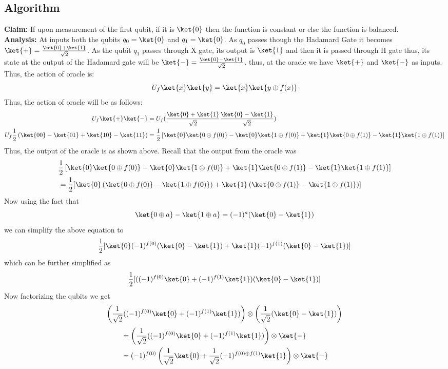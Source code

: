\documentclass[12pt, oneside]{book}
\theoremstyle{definition}
\theoremstyle{definition}
\theoremstyle{remark}
\begin{document}
\subsection{Algorithm}
\textbf{Claim: }If upon measurement of the first qubit, if it is $\ket{0}$ then the function is constant or else the function is balanced.
\\
\textbf{Analysis: }At inputs both the qubits $q_0=\ket{0}$ and $q_1=\ket{0}$. As $q_0$ passes though the Hadamard Gate it becomes $\ket{+}=\frac{\ket{0}+\ket{1}}{\sqrt{2}}$.
As the qubit $q_1$ passes through X gate, its output is $\ket{1}$ and then it is passed through H gate thus, its state at the output of the Hadamard gate will be $\ket{-}= \frac{\ket{0}-\ket{1}}{\sqrt{2}}$.
thus, at the oracle we have $\ket{+}$ and $\ket{-}$ as inputs. Thus, the action of oracle is:
\[
    U_f\ket{x}\ket{y}=\ket{x}\ket{y\oplus f(x)}
\]
Thus, the action of oracle will be as follows:
\begin{align*}
    U_f\ket{+}\ket{-}&=U_f(\frac{\ket{0}+\ket{1}}{\sqrt{2}}\frac{\ket{0}-\ket{1}}{\sqrt{2}})\\
    U_f\frac{1}{2}\left(\ket{00}-\ket{01}+\ket{10}-\ket{11}\right)&=\frac{1}{2}\left[\ket{0}\ket{0\oplus f(0)}-\ket{0}\ket{1\oplus f(0)}+\ket{1}\ket{0\oplus f(1)}-\ket{1}\ket{1\oplus f(1)}\right]
\end{align*}
Thus, the output of the oracle is as shown above. Recall that the output from the oracle was
\begin{align*}
&\frac{1}{2}\left[\ket{0}\ket{0\oplus f(0)}-\ket{0}\ket{1\oplus f(0)}+\ket{1}\ket{0\oplus f(1)}-\ket{1}\ket{1\oplus f(1)}\right]\\
&=\frac{1}{2}[\ket{0}\left(\ket{0\oplus f(0)}-\ket{1\oplus f(0)}\right) + \ket{1}\left(\ket{0 \oplus f(1)} - \ket{1 \oplus f(1)} \right)]
\end{align*}
Now using the fact that 
\[
\ket{0 \oplus a}-\ket{1 \oplus a} = (-1)^a(\ket{0}-\ket{1})
\]
we can simplify the above equation to
\[
\frac{1}{2}[\ket{0}(-1)^{f(0)}(\ket{0}-\ket{1}) + \ket{1}(-1)^{f(1)}(\ket{0}-\ket{1})]
\]
which can be further simplified as
\[
\frac{1}{2}[((-1)^{f(0)}\ket{0}+(-1)^{f(1)}\ket{1})(\ket{0}-\ket{1})]
\]
Now factorizing the qubits we get
\[
\left(\frac{1}{\sqrt{2}}((-1)^{f(0)}\ket{0}+(-1)^{f(1)}\ket{1})\right)\otimes \left(\frac{1}{\sqrt{2}}(\ket{0}-\ket{1})\right)
\]
\begin{align*}
&=\left(\frac{1}{\sqrt{2}}((-1)^{f(0)}\ket{0}+(-1)^{f(1)}\ket{1})\right)\otimes \ket{-}\\
&=(-1)^{f(0)}\left(\frac{1}{\sqrt{2}}\ket{0}+\frac{1}{\sqrt{2}}(-1)^{f(0)\oplus f(1)}\ket{1}\right)\otimes \ket{-}
\end{align*}
\end{document}
